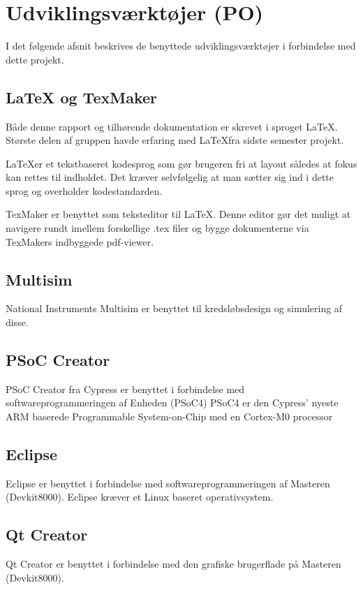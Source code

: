 
\chapter{Udviklingsværktøjer (PO)} \label{head:udviklingsvaektoejer}
I det følgende afsnit beskrives de benyttede udviklingsværktøjer i forbindelse med dette projekt. 

\section{LaTeX og TexMaker}
Både denne rapport og tilhørende dokumentation er skrevet i sproget \LaTeX. Største delen af gruppen havde erfaring med \LaTeX fra sidste semester projekt. 

\LaTeX er et tekstbaseret kodesprog som gør brugeren fri at layout således at fokus kan rettes til indholdet. Det kræver selvfølgelig at man sætter sig ind i dette sprog og overholder kodestandarden. 

TexMaker er benyttet som teksteditor til \LaTeX. Denne editor gør det muligt at navigere rundt imellem forskellige .tex filer og bygge dokumenterne via TexMakers indbyggede pdf-viewer.

\section{Multisim}
National Instruments Multisim er benyttet til kredsløbsdesign og simulering af disse. 

\section{PSoC Creator}
PSoC Creator fra Cypress er benyttet i forbindelse med softwareprogrammeringen af Enheden (PSoC4)
PSoC4 er den Cypress' nyeste ARM baserede Programmable System-on-Chip med en Cortex-M0 processor 

\section{Eclipse}
Eclipse er benyttet i forbindelse med softwareprogrammeringen af Masteren (Devkit8000). Eclipse kræver et Linux baseret operativsystem.

\section{Qt Creator}
Qt Creator er benyttet i forbindelse med den grafiske brugerflade på Masteren (Devkit8000).


